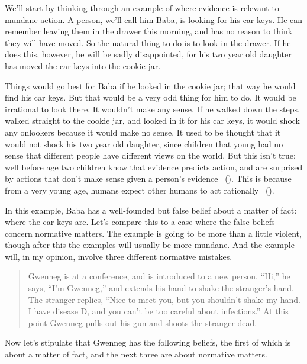 \documentclass[
  10pt,
  letterpaper,
  twoside]{scrbook}
\begin{document}
We'll start by thinking through an example of where evidence is relevant
to mundane action. A person, we'll call him {Baba}, is looking for his
car keys. He can remember leaving them in the drawer this morning, and
has no reason to think they will have moved. So the natural thing to do
is to look in the drawer. If he does this, however, he will be sadly
disappointed, for his two year old daughter has moved the car keys into
the cookie jar.

Things would go best for {Baba} if he looked in the cookie jar; that way
he would find his car keys. But that would be a very odd thing for him
to do. It would be irrational to look there. It wouldn't make any sense.
If he walked down the steps, walked straight to the cookie jar, and
looked in it for his car keys, it would shock any onlookers because it
would make no sense. It used to be thought that it would not shock his
two year old daughter, since children that young had no sense that
different people have different views on the world. But this isn't true;
well before age two children know that evidence predicts action, and are
surprised by actions that don't make sense given a person's evidence
~().
This is because from a very young age, humans expect other humans to act
rationally ~().

In this example, {Baba} has a well-founded but false belief about a
matter of fact: where the car keys are. Let's compare this to a case
where the false beliefs concern normative matters. The example is going
to be more than a little violent, though after this the examples will
usually be more mundane. And the example will, in my opinion, involve
three different normative mistakes.

\begin{quote}
{Gwenneg} is at a conference, and is introduced to a new person. ``Hi,''
he says, ``I'm {Gwenneg},'' and extends his hand to shake the stranger's
hand. The stranger replies, ``Nice to meet you, but you shouldn't shake
my hand. I have disease D, and you can't be too careful about
infections.'' At this point {Gwenneg} pulls out his gun and shoots the
stranger dead.
\end{quote}

Now let's stipulate that {Gwenneg} has the following beliefs, the first
of which is about a matter of fact, and the next three are about
normative matters.
\end{document}

